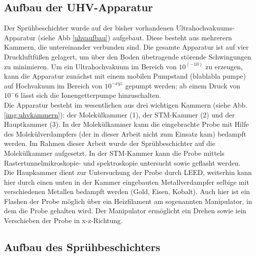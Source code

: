 \subsection{Aufbau der UHV-Apparatur}

Der Sprühbeschichter wurde auf der bisher vorhandenen Ultrahochvakuums-Apparatur (siehe Abb \ref{uhvaufbau})
aufgebaut.
Diese besteht aus mehrerern Kammern, die untereinander verbunden sind. Die gesamte Apparatur ist auf vier
Druckluftfüßen gelagert, um über den Boden übetragende störende Schwingungen zu minimieren. Um ein
Ultrahochvakuum im Bereich von $10^(-10)$ zu erzeugen, kann die Apparatur zunächst mit einem mobilen Pumpstand 
(blablabla pumpe) auf Hochvakuum im Bereich von $10^{-xyz}$ gepumpt werden; ab einem Druck von $10^-6$ lässt
sich die Ionengetterpumpe hinzuschalten.\\
Die Apparatur besteht im wesentlichen aus drei wichtigen Kammern (siehe Abb. \ref{img:uhvkammern}): der 
Molekülkammer (1), der STM-Kammer (2) und der Hauptkammer (3). In der Molekülkammer kann die eingebrachte
Probe mit Hilfe des Molekülverdampfers (der in dieser Arbeit nicht zum Einsatz kam) bedampft werden. Im Rahmen
dieser Arbeit wurde der Sprühbeschichter auf die Molekülkammer aufgesetzt. In der STM-Kammer kann die Probe
mittels Rastertunnelmikroskopie- und spektroskopie untersucht sowie geflasht werden. Die Haupkammer dient zur
Untersuchung der Probe durch LEED, weiterhin kann hier durch einen unten in der Kammer eingebauten
Metallverdampfer selbige mit verschiedenen Metallen bedampft werden (Gold, Eisen, Kobalt). Auch hier ist ein
Flashen der Probe möglich über ein Heizfilament am sogenannten Manipulator, in dem die Probe gehalten wird.
Der Manipulator ermöglicht ein Drehen sowie iein Verschieben der Probe in x-z-Richtung.\\



\subsection{Aufbau des Sprühbeschichters}

